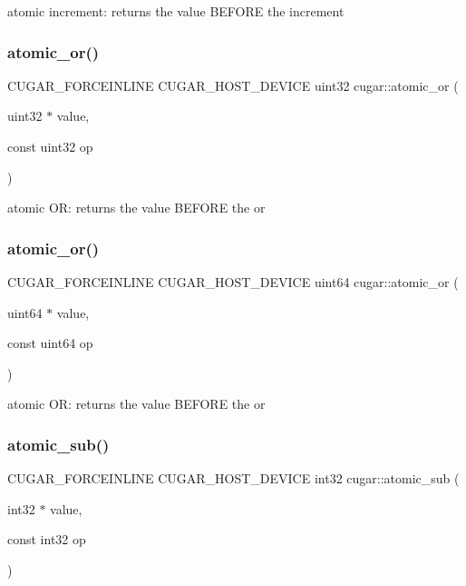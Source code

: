 atomic increment\+: returns the value B\+E\+F\+O\+RE the increment \mbox{\label{group___atomics_ga4b242819dd9c2a9986e0ea35b4883f67}} 
\subsubsection{\texorpdfstring{atomic\+\_\+or()}{atomic\_or()}\hspace{0.1cm}{\footnotesize\ttfamily [1/2]}}
{\footnotesize\ttfamily C\+U\+G\+A\+R\+\_\+\+F\+O\+R\+C\+E\+I\+N\+L\+I\+NE C\+U\+G\+A\+R\+\_\+\+H\+O\+S\+T\+\_\+\+D\+E\+V\+I\+CE uint32 cugar\+::atomic\+\_\+or (\begin{DoxyParamCaption}\item[{uint32 $\ast$}]{value,  }\item[{const uint32}]{op }\end{DoxyParamCaption})}

atomic OR\+: returns the value B\+E\+F\+O\+RE the or \mbox{\label{group___atomics_ga5d15edb3c64f3cde839eb76c54aacf7c}} 
\subsubsection{\texorpdfstring{atomic\+\_\+or()}{atomic\_or()}\hspace{0.1cm}{\footnotesize\ttfamily [2/2]}}
{\footnotesize\ttfamily C\+U\+G\+A\+R\+\_\+\+F\+O\+R\+C\+E\+I\+N\+L\+I\+NE C\+U\+G\+A\+R\+\_\+\+H\+O\+S\+T\+\_\+\+D\+E\+V\+I\+CE uint64 cugar\+::atomic\+\_\+or (\begin{DoxyParamCaption}\item[{uint64 $\ast$}]{value,  }\item[{const uint64}]{op }\end{DoxyParamCaption})}

atomic OR\+: returns the value B\+E\+F\+O\+RE the or \mbox{\label{group___atomics_ga3efc1d5c63f30d1ee11887f76744bafe}} 
\subsubsection{\texorpdfstring{atomic\+\_\+sub()}{atomic\_sub()}\hspace{0.1cm}{\footnotesize\ttfamily [1/2]}}
{\footnotesize\ttfamily C\+U\+G\+A\+R\+\_\+\+F\+O\+R\+C\+E\+I\+N\+L\+I\+NE C\+U\+G\+A\+R\+\_\+\+H\+O\+S\+T\+\_\+\+D\+E\+V\+I\+CE int32 cugar\+::atomic\+\_\+sub (\begin{DoxyParamCaption}\item[{int32 $\ast$}]{value,  }\item[{const int32}]{op }\end{DoxyParamCaption})}

